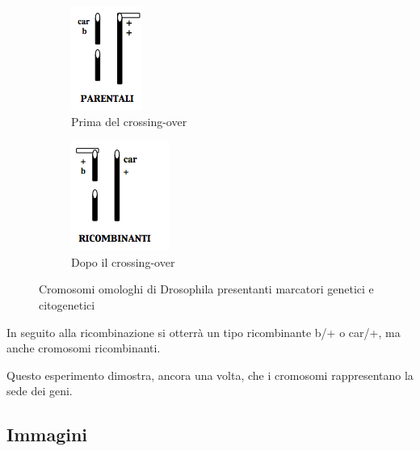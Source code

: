 \documentclass[11pt]{book}
\begin{document}
\begin{figure}[h]
\centering
\begin{subfigure}{.5\textwidth}
  \centering
  \includegraphics[width=.3\linewidth]{./img/03_cromosomiDrosophila.png}
  \caption{Prima del crossing-over}
  \label{fig:sub1}
\end{subfigure}%
\begin{subfigure}{.5\textwidth}
  \centering
  \includegraphics[width=.4\linewidth]{./img/04_crossingoverDrosophila.png}
  \caption{Dopo il crossing-over}
  \label{fig:sub2}
\end{subfigure}
\caption{Cromosomi omologhi di Drosophila presentanti marcatori genetici e citogenetici}
\label{fig:test}
\end{figure}

In seguito alla ricombinazione si otterrà un tipo ricombinante b/+ o car/+, ma anche cromosomi ricombinanti.

Questo esperimento dimostra, ancora una volta, che i cromosomi rappresentano la sede dei geni.


\subsection{Immagini}
\end{document}
